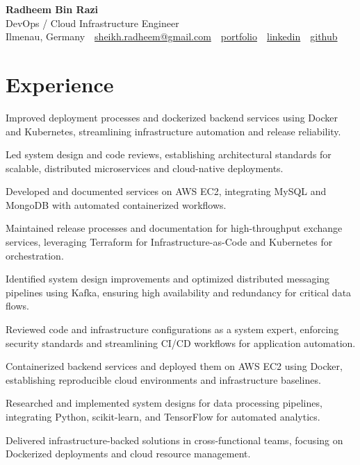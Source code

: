 \documentclass[11pt,a4paper]{resume}
\makeatletter
\newcommand{\Portfolio}{https://radheem.github.io/my-cv}
\newcommand{\PortfolioText}{portfolio}
\newcommand{\GitHub}{https://github.com/radheem}
\newcommand{\LinkedIn}{https://www.linkedin.com/in/radheem-razi}
\newcommand{\Email}{sheikh.radheem@gmail.com}
\makeatother
\begin{document}
\begin{center}
  {\huge\bfseries Radheem Bin Razi}\\[3pt]
  {\large DevOps / Cloud Infrastructure Engineer}\\[6pt]
  \small
  Ilmenau, Germany \,\textbar\,
  \href{mailto:\Email}{\Email} \,\textbar\,
  \href{\Portfolio}{\PortfolioText} \,\textbar\,
  \href{\LinkedIn}{linkedin} \,\textbar\,
  \href{\GitHub}{github}
\end{center}
\vspace{2pt}

\section{Experience}

\bullets
  \item Improved deployment processes and dockerized backend services using Docker and Kubernetes, streamlining infrastructure automation and release reliability.
  \item Led system design and code reviews, establishing architectural standards for scalable, distributed microservices and cloud-native deployments.
  \item Developed and documented services on AWS EC2, integrating MySQL and MongoDB with automated containerized workflows.
\bulletsend
\vspace{3pt}
\bullets
  \item Maintained release processes and documentation for high-throughput exchange services, leveraging Terraform for Infrastructure-as-Code and Kubernetes for orchestration.
  \item Identified system design improvements and optimized distributed messaging pipelines using Kafka, ensuring high availability and redundancy for critical data flows.
  \item Reviewed code and infrastructure configurations as a system expert, enforcing security standards and streamlining CI/CD workflows for application automation.
\bulletsend
\vspace{3pt}
\bullets
  \item Containerized backend services and deployed them on AWS EC2 using Docker, establishing reproducible cloud environments and infrastructure baselines.
  \item Researched and implemented system designs for data processing pipelines, integrating Python, scikit-learn, and TensorFlow for automated analytics.
  \item Delivered infrastructure-backed solutions in cross-functional teams, focusing on Dockerized deployments and cloud resource management.
\bulletsend
\vspace{3pt}
\end{document}
